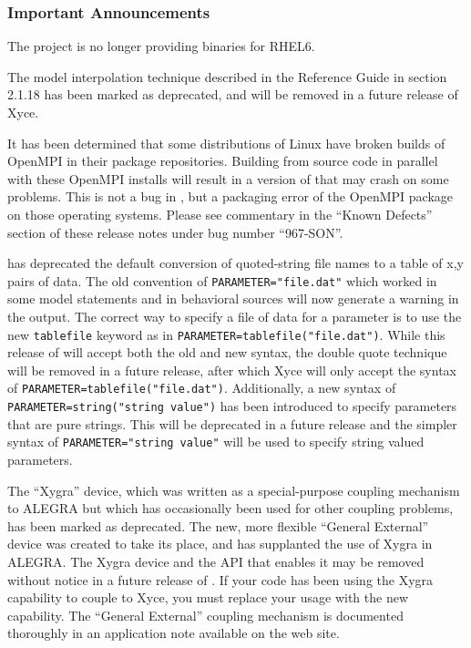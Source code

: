 \documentclass[letterpaper]{scrartcl}
\begin{document}
\subsubsection*{Important Announcements}
\begin{XyceItemize}
\item The \Xyce{} project is no longer providing binaries for RHEL6.
\item The model interpolation technique described in the \Xyce{}
  Reference Guide in section 2.1.18 has been marked as deprecated, and
  will be removed in a future release of Xyce.
\item It has been determined that some distributions of Linux have
  broken builds of OpenMPI in their package repositories.  Building
  \Xyce{} from source code in parallel with these OpenMPI installs
  will result in a version of \Xyce{} that may crash on some problems.
  This is not a bug in \Xyce{}, but a packaging error of the OpenMPI
  package on those operating systems.  Please see commentary in the
  ``Known Defects'' section of these release notes under bug number
  ``967-SON''.
\item \Xyce{} has deprecated the default conversion of quoted-string file
  names to a table of x,y pairs of data.  The old convention of
  \texttt{PARAMETER="file.dat"} which worked in some model statements
  and in behavioral sources will now generate a warning in the \Xyce{}
  output.  The correct way to specify a file of data for a parameter
  is to use the new \texttt{tablefile} keyword as in
  \texttt{PARAMETER=tablefile("file.dat")}.  While this release of
  \Xyce{} will accept both the old and new syntax, the double quote
  technique will be removed in a future release, after which Xyce
  will only accept the syntax of
  \texttt{PARAMETER=tablefile("file.dat")}.  Additionally, a new
  syntax of \texttt{PARAMETER=string("string value")} has been
  introduced to specify parameters that are pure strings.  This will
  be deprecated in a future release and the simpler syntax of
  \texttt{PARAMETER="string value"} will be used to specify string
  valued parameters.
\item The ``Xygra'' device, which was written as a special-purpose
  coupling mechanism to ALEGRA but which has occasionally been used
  for other coupling problems, has been marked as deprecated.  The
  new, more flexible ``General External'' device was created to take
  its place, and has supplanted the use of Xygra in ALEGRA.  The Xygra
  device and the API that enables it may be removed without notice in
  a future release of \Xyce{}. If your code has been using the Xygra
  capability to couple to Xyce, you must replace your usage with the
  new capability.  The ``General External'' coupling mechanism is
  documented thoroughly in an application note available on the
  \Xyce{} web site.
\end{XyceItemize}
\end{document}
